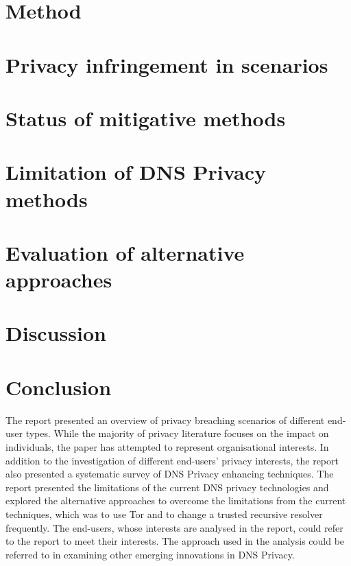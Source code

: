 \documentclass[a4paper,12pt]{article}
\begin{document}
\newpage
\section{Method}\label{Method}


\newpage
\section{Privacy infringement in scenarios}\label{scenariosresult}


\newpage
\section{Status of mitigative methods}\label{surveyresults}


\newpage
\section{Limitation of DNS Privacy methods}\label{limitationsresult}


\newpage
\section{Evaluation of alternative approaches}\label{alternativeresult}

\newpage

\section{Discussion}

\newpage

\section{Conclusion}
The report presented an overview of privacy breaching scenarios of different end-user types.
While the majority of privacy literature focuses on the impact on individuals, the paper has attempted to represent organisational interests.
In addition to the investigation of different end-users' privacy interests, the report also presented a systematic survey of DNS Privacy enhancing techniques.
The report presented the limitations of the current DNS privacy technologies and explored the alternative approaches to overcome the limitations from the current techniques, which was to use Tor and to change a trusted recursive resolver frequently.
The end-users, whose interests are analysed in the report, could refer to the report to meet their interests.
The approach used in the analysis could be referred to in examining other emerging innovations in DNS Privacy. 
\end{document}
